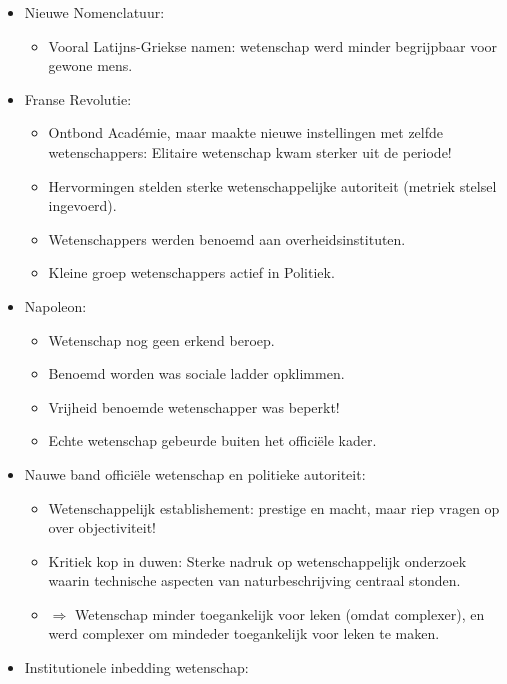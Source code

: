 \documentclass{article}
\begin{document}
\begin{itemize}
\begin{itemize}
\begin{itemize}
        \end{itemize}
      \end{itemize}
      \item Nieuwe Nomenclatuur:
      \begin{itemize}
        \item Vooral Latijns-Griekse namen: wetenschap werd minder begrijpbaar voor gewone mens.
      \end{itemize}
      \item Franse Revolutie:
      \begin{itemize}
        \item Ontbond Acad\'emie, maar maakte nieuwe instellingen met zelfde wetenschappers: Elitaire wetenschap kwam sterker uit de periode!
        \item Hervormingen stelden sterke wetenschappelijke autoriteit (metriek stelsel ingevoerd).
        \item Wetenschappers werden benoemd aan overheidsinstituten.
        \item Kleine groep wetenschappers actief in Politiek.
      \end{itemize}
      \item Napoleon:
      \begin{itemize}
        \item Wetenschap nog geen erkend beroep.
        \item Benoemd worden was sociale ladder opklimmen.
        \item Vrijheid benoemde wetenschapper was beperkt!
        \item Echte wetenschap gebeurde buiten het offici\"ele kader.
      \end{itemize}
      \item Nauwe band offici\"ele wetenschap en politieke autoriteit:
      \begin{itemize}
        \item Wetenschappelijk establishement: prestige en macht, maar riep vragen op over objectiviteit!
        \item Kritiek kop in duwen: Sterke nadruk op wetenschappelijk onderzoek waarin technische aspecten van naturbeschrijving centraal stonden.
        \item $\Rightarrow$ Wetenschap minder toegankelijk voor leken (omdat complexer), en werd complexer om mindeder toegankelijk voor leken te maken.
      \end{itemize}
      \item Institutionele inbedding wetenschap:

\end{itemize}
\end{document}
